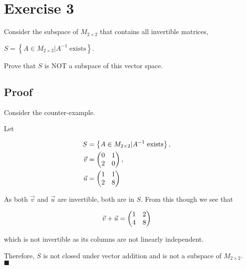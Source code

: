 \section*{Exercise 3}

Consider the subspace of $M_{2 \times 2}$ that contains all invertible matrices, 

$S = \left\{ A \in M_{2 \times 2} | A^{-1} \; \text{exists} \right\}$. 

Prove that $S$ is NOT a subspace of this vector space.

\subsection*{Proof}

Consider the counter-example.

Let 

\[
	\begin{aligned}
		S &= \left\{ A \in M_{2 \times 2} | A^{-1} \; \text{exists} \right\}, \\
		\vec{v} &=  \begin{pmatrix} 0&1\\2&0 \end{pmatrix} , \\
		\vec{u} &=  \begin{pmatrix} 1&1\\2&8 \end{pmatrix} 
	\end{aligned}
\]

As both $\vec{v}$ and $\vec{u}$ are invertible, both are in $S$. From this though we see that

\[\vec{v} + \vec{u} =  \begin{pmatrix} 1&2\\4&8 \end{pmatrix} \]

which is not invertible as its columns are not linearly independent.

Therefore, $S$ is not closed under vector addition and is not a subspace of $M_{2 \times 2}$. $\blacksquare$
